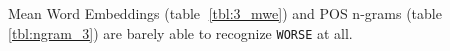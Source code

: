 %    




Mean Word Embeddings (table \ref{tbl:3_mwe}) and POS n-grams (table \ref{tbl:ngram_3}) are barely able to recognize \texttt{WORSE} at all.

